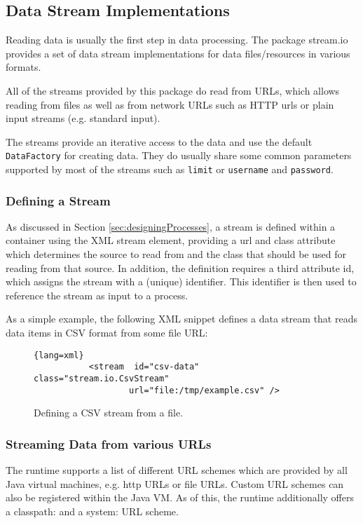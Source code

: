 \subsection{\label{app:dataStreams}\label{api:stream:io}Data Stream Implementations}

Reading data is usually the first step in data processing. The package
{\ttfamily stream.io} provides a set of data stream implementations
for data files/resources in various formats.

All of the streams provided by this package do read from URLs, which
allows reading from files as well as from network URLs such as HTTP
urls or plain input streams (e.g. standard input).

The streams provide an iterative access to the data and use the default
\texttt{DataFactory} for creating data. They do usually share some
common parameters supported by most of the streams such as
\texttt{limit} or \texttt{username} and \texttt{password}.

\subsubsection*{Defining a Stream}
As discussed in Section \ref{sec:designingProcesses}, a stream is
defined within a container using the XML {\ttfamily stream} element,
providing a {\ttfamily url} and {\ttfamily class} attribute which
determines the source to read from and the class that should be used
for reading from that source. In addition, the definition requires a
third attribute {\ttfamily id}, which assigns the stream with a
(unique) identifier. This identifier is then used to reference the
stream as input to a process.

As a simple example, the following XML snippet defines a data stream
that reads data items in CSV format from some file URL:
\begin{figure}[h!]
        \centering
        \begin{lstlisting}{lang=xml}
           <stream  id="csv-data" class="stream.io.CsvStream"
                   url="file:/tmp/example.csv" />
        \end{lstlisting}
        \caption{Defining a CSV stream from a file.}
\end{figure}

\subsubsection*{Streaming Data from various URLs}
The \streams runtime supports a list of different URL schemes which
are provided by all Java virtual machines, e.g. {\ttfamily http} URLs
or {\ttfamily file} URLs. Custom URL schemes can also be registered
within the Java VM. As of this, the \streams runtime additionally
offers a {\ttfamily classpath:} and a {\ttfamily system:} URL scheme.

